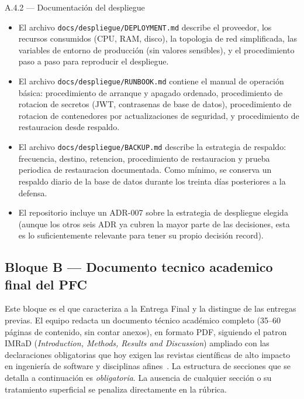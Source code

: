 \documentclass[11pt,a4paper]{article}
\begin{document}
\begin{cajaentregable}{A.4.2 --- Documentaci\'{o}n del despliegue}
    \begin{itemize}
        \item El archivo \texttt{docs/despliegue/DEPLOYMENT.md} describe el proveedor, los recursos consumidos (CPU, RAM, disco), la topologia de red simplificada, las variables de entorno de producci\'{o}n (sin valores sensibles), y el procedimiento paso a paso para reproducir el despliegue.
        \item El archivo \texttt{docs/despliegue/RUNBOOK.md} contiene el manual de operaci\'{o}n b\'{a}sica: procedimiento de arranque y apagado ordenado, procedimiento de rotacion de secretos (JWT, contrasenas de base de datos), procedimiento de rotacion de contenedores por actualizaciones de seguridad, y procedimiento de restauracion desde respaldo.
        \item El archivo \texttt{docs/despliegue/BACKUP.md} describe la estrategia de respaldo: frecuencia, destino, retencion, procedimiento de restauracion y prueba periodica de restauracion documentada. Como m\'{i}nimo, se conserva un respaldo diario de la base de datos durante los treinta d\'{i}as posteriores a la defensa.
        \item El repositorio incluye un ADR-007 sobre la estrategia de despliegue elegida (aunque los otros seis ADR ya cubren la mayor parte de las decisiones, esta es lo suficientemente relevante para tener su propio decisi\'{o}n record).
    \end{itemize}
\end{cajaentregable}

\subsection{Bloque B --- Documento tecnico academico final del PFC}

Este bloque es el que caracteriza a la Entrega Final y la distingue de las entregas previas. El equipo redacta un documento t\'{e}cnico acad\'{e}mico completo (35--60 p\'{a}ginas de contenido, sin contar anexos), en formato PDF, siguiendo el patron IMRaD (\emph{Introduction, Methods, Results and Discussion}) ampliado con las declaraciones obligatorias que hoy exigen las revistas cient\'{i}ficas de alto impacto en ingenier\'{i}a de software y disciplinas afines~\cite{ralph2021empirical,simera2010catalogue,page2021prisma}. La estructura de secciones que se detalla a continuaci\'{o}n es \emph{obligatoria}. La ausencia de cualquier secci\'{o}n o su tratamiento superficial se penaliza directamente en la r\'{u}brica.
\end{document}
